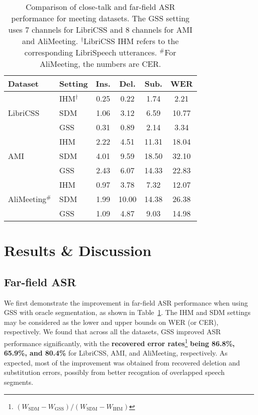 \documentclass[a4paper]{article}
\begin{document}
\begin{table}[t]
\centering
\caption{Comparison of close-talk and far-field ASR performance for meeting datasets. The GSS setting uses 7 channels for LibriCSS and 8 channels for AMI and AliMeeting. $^\dagger$LibriCSS IHM refers to the corresponding LibriSpeech utterances. $^\#$For AliMeeting, the numbers are CER.}
\label{tab:asr}
\begin{tabular}{@{}llcccc@{}}
\toprule
\textbf{Dataset} & \textbf{Setting} & \textbf{Ins.} & \textbf{Del.} & \textbf{Sub.} & \textbf{WER} \\ \midrule
\multirow{3}{*}{LibriCSS} & IHM$^\dagger$ & 0.25 & 0.22 & 1.74 & 2.21 \\
 & SDM & 1.06 & 3.12 & 6.59 & 10.77 \\
 & GSS & 0.31 & 0.89 & 2.14 & 3.34 \\
\hline \hline
\multirow{3}{*}{AMI} & IHM & 2.22 & 4.51 & 11.31 & 18.04 \\
 & SDM & 4.01 & 9.59 & 18.50 & 32.10 \\
 & GSS & 2.43 & 6.07 & 14.33 & 22.83 \\
\hline \hline
\multirow{3}{*}{AliMeeting$^\#$} & IHM & 0.97 & 3.78 & 7.32 & 12.07 \\
 & SDM & 1.99 & 10.00 & 14.38 & 26.38 \\
 & GSS & 1.09 & 4.87 & 9.03 & 14.98 \\ 
\bottomrule
\end{tabular}
\end{table}




\section{Results \& Discussion}

\subsection{Far-field ASR}
\label{sec:asr}

We first demonstrate the improvement in far-field ASR performance when using GSS with oracle segmentation, as shown in Table~\ref{tab:asr}. The IHM and SDM settings may be considered as the lower and upper bounds on WER (or CER), respectively. We found that across all the datasets, GSS improved ASR performance significantly, with the \textbf{recovered error rates}\footnote{$\left( W_{\mathrm{SDM}} - W_{\mathrm{GSS}} \right)/ \left( W_{\mathrm{SDM}} - W_{\mathrm{IHM}} \right)$} \textbf{being 86.8\%, 65.9\%, and 80.4\%} for LibriCSS, AMI, and AliMeeting, respectively. As expected, most of the improvement was obtained from recovered deletion and substitution errors, possibly from better recogntion of overlapped speech segments.
\end{document}
